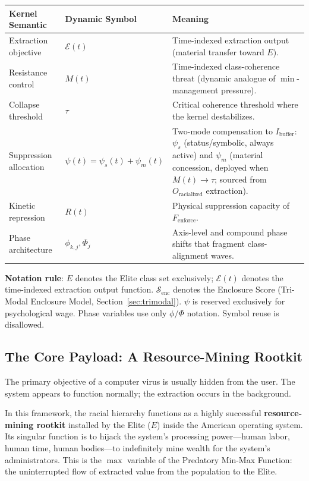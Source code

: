 \begin{center}
\renewcommand{\arraystretch}{1.35}
\begin{tabular}{>{\raggedright}p{3.3cm} >{\raggedright}p{3.4cm} >{\raggedright\arraybackslash}p{7.4cm}}
\toprule
\textbf{Kernel Semantic} & \textbf{Dynamic Symbol} & \textbf{Meaning} \\
\midrule
Extraction objective & $\mathcal{E}(t)$ & Time-indexed extraction output (material transfer toward $E$). \\
Resistance control & $M(t)$ & Time-indexed class-coherence threat (dynamic analogue of $\min$-management pressure). \\
Collapse threshold & $\tau$ & Critical coherence threshold where the kernel destabilizes. \\
Suppression allocation & $\psi(t) = \psi_s(t) + \psi_m(t)$ & Two-mode compensation to $I_{\text{buffer}}$: $\psi_s$ (status/symbolic, always active) and $\psi_m$ (material concession, deployed when $M(t) \to \tau$; sourced from $O_{\text{racialized}}$ extraction). \\
Kinetic repression & $R(t)$ & Physical suppression capacity of $F_{\text{enforce}}$. \\
Phase architecture & $\phi_{k,j}, \Phi_j$ & Axis-level and compound phase shifts that fragment class-alignment waves. \\
\bottomrule
\end{tabular}
\end{center}

\textbf{Notation rule}: $E$ denotes the Elite class set exclusively; $\mathcal{E}(t)$ denotes the time-indexed extraction output function. $\mathcal{S}_{\text{enc}}$ denotes the Enclosure Score (Tri-Modal Enclosure Model, Section~\ref{sec:trimodal}). $\psi$ is reserved exclusively for psychological wage. Phase variables use only $\phi/\Phi$ notation. Symbol reuse is disallowed.

\subsection{The Core Payload: A Resource-Mining Rootkit}

The primary objective of a computer virus is usually hidden from the user. The system appears to function normally; the extraction occurs in the background.

In this framework, the racial hierarchy functions as a highly successful \textbf{resource-mining rootkit} installed by the Elite ($E$) inside the American operating system. Its singular function is to hijack the system's processing power---human labor, human time, human bodies---to indefinitely mine wealth for the system's administrators. This is the $\max$ variable of the Predatory Min-Max Function: the uninterrupted flow of extracted value from the population to the Elite.

